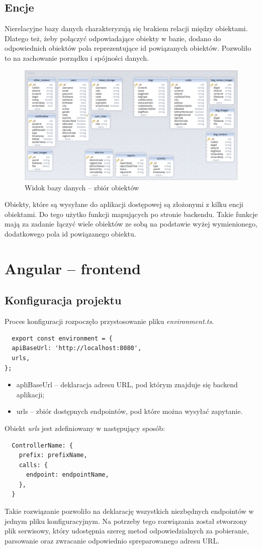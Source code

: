 \subsection{Encje}
Nierelacyjne bazy danych charakteryzują się brakiem relacji między obiektami. Dlatego też, żeby połączyć odpowiadające obiekty w bazie, dodano do odpowiednich obiektów pola reprezentujące id powiązanych obiektów. Pozwoliło to na zachowanie porządku i spójności danych.
\begin{figure}[H]
  \centering
  \includegraphics[width=1\linewidth]{rysunki/database.PNG}
  \caption{Widok bazy danych -- zbiór obiektów}
  \label{fig:database}
\end{figure}  
Obiekty, które są wysyłane do aplikacji dostępowej są złożonymi z kilku encji obiektami. Do tego użytko funkcji mapujących po stronie backendu. Takie funkcje mają za zadanie łączyć wiele obiektów ze sobą na podstawie wyżej wymienionego, dodatkowego pola id powiązanego obiektu.

\newpage
\section{Angular -- frontend}

\subsection{Konfiguracja projektu}
Proces konfiguracji rozpoczęło przystosowanie pliku \textit{environment.ts}.
\begin{lstlisting}
  export const environment = {
  apiBaseUrl: 'http://localhost:8080',
  urls,
};
\end{lstlisting}
\begin{itemize}
  \item apliBaseUrl -- deklaracja adresu URL, pod którym znajduje się backend aplikacji;
  \item urls -- zbiór dostępnych endpointów, pod które można wysyłać zapytanie.
\end{itemize}
Obiekt \textit{urls} jest zdefiniowany w następujący sposób:
\begin{lstlisting}
  ControllerName: {
    prefix: prefixName,
    calls: {
      endpoint: endpointName,
    },
  }
\end{lstlisting}
Takie rozwiązanie pozwoliło na deklarację wszystkich niezbędnych endpointów w jednym pliku konfiguracyjnym. Na potrzeby tego rozwiązania został stworzony plik serwisowy, który udostępnia szereg metod odpowiedzialnych za pobieranie, parsowanie oraz zwracanie odpowiednio spreparowanego adresu URL.

